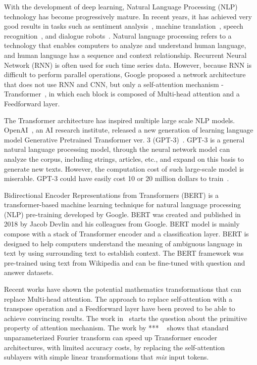 With the development of deep learning, Natural Language Processing (NLP) technology has become progressively mature. In recent years, it has achieved very good results in tasks such as sentiment analysis~\cite{}, machine translation~\cite{}, speech recognition~\cite{}, and dialogue robots~\cite{}.
Natural language processing refers to a technology that enables computers to analyze and understand human language, and human language has a sequence and context relationship. Recurrent Neural Network (RNN) is often used for such time series data. However, because RNN is difficult to perform parallel operations, Google proposed a network architecture that does not use RNN and CNN, but only a self-attention mechanism - Transformer~\cite{NIPS2017_3f5ee243}, in which each block is composed of Multi-head attention and a Feedforward layer.

The Transformer architecture has inspired multiple large scale NLP models. OpenAI~\cite{}, an AI research institute, released a new generation of learning language model Generative Pretrained Transformer ver. 3 (GPT-3)~\cite{NEURIPS2020_1457c0d6}. GPT-3 is a general natural language processing model, through the neural network model can analyze the corpus, including strings, articles, etc., and expand on this basis to generate new texts. However, the computation cost of such large-scale model is miserable. GPT-3 could have easily cost 10 or 20 million dollars to train~\cite{}.

Bidirectional Encoder Representations from Transformers (BERT) is a transformer-based machine learning technique for natural language processing (NLP) pre-training developed by Google. BERT was created and published in 2018 by Jacob Devlin and his colleagues from Google. BERT model is mainly compose with a stack of Transformer encoder and a classification layer. BERT is designed to help computers understand the meaning of ambiguous language in text by using surrounding text to establish context. The BERT framework was pre-trained using text from Wikipedia and can be fine-tuned with question and answer datasets.

Recent works have shown the potential mathematics transformations that can replace Multi-head attention. The approach to replace self-attention with a transpose operation and a Feedforward layer have been proved to be able to achieve convincing results. The work in~\cite{DBLP:journals/corr/abs-2105-02723} starts the question about the primitive property of attention mechanism. The work by *** \etal~\cite{DBLP:journals/corr/abs-2105-03824} shows that standard unparameterized Fourier transform can speed up Transformer encoder architectures, with limited accuracy costs, by replacing the self-attention sublayers with simple linear transformations that \emph{mix} input tokens.
